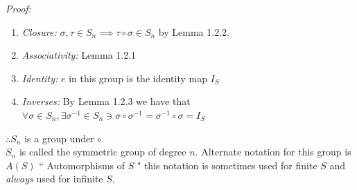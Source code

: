 \textit{Proof:}
\begin{enumerate}[label=(\roman*)]
    \item \textit{Closure: } $\sigma, \tau \in S_n \implies \tau \circ \sigma \in S_n$ by Lemma 1.2.2.
    \item \textit{Associativity: } Lemma 1.2.1
    \item \textit{Identity: } $e$ in this group is the identity map $I_S$
    \item \textit{Inverses: } By Lemma 1.2.3 we have that $\forall \sigma \in S_n,  \exists \sigma^{-1}\in S_n \ni \sigma\circ\sigma^{-1}=\sigma^{-1}\circ\sigma=I_S$
\end{enumerate}
$\therefore S_n$ is a group under $\circ$.\steezybreak\\
\noindent $S_n$ is called the symmetric group of degree $n$. Alternate notation for this group is $A(S)$ `` Automorphisms of $S$ " this notation is sometimes used for finite $S$ and \textit{always} used for infinite $S$.


